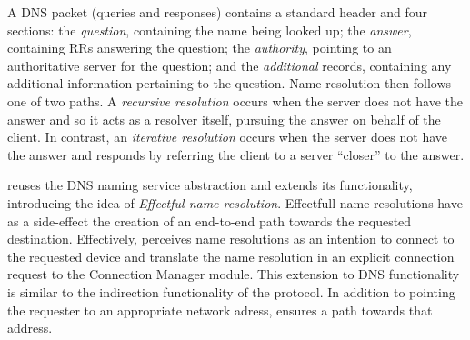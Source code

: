 A DNS packet (queries and responses)  contains a standard header and four
sections: the \emph{question}, containing the name being looked up; the
\emph{answer}, containing RRs answering the question; the \emph{authority},
pointing to an authoritative server for the question; and the \emph{additional}
records, containing any additional information pertaining to the question. Name
resolution then follows one of two paths. A \emph{recursive resolution} occurs
when the server does not have the answer and so it acts as a resolver itself,
pursuing the answer on behalf of the client. In contrast, an \emph{iterative
  resolution} occurs when the server does not have the answer and responds by
referring the client to a server ``closer'' to the answer.

\signpost reuses the DNS naming service abstraction and extends its
functionality, introducing the idea of \textit{Effectful name resolution}.
Effectfull name resolutions have as a side-effect  the creation of an end-to-end
path towards the requested destination.  Effectively, \signpost perceives name
resolutions as an intention to connect to the requested device and translate the
name resolution in an explicit connection request to the Connection Manager
module. This extension to DNS functionality is similar to the indirection
functionality of the protocol. In addition to pointing the requester to an
appropriate network adress, \signpost ensures a path towards that address. 



